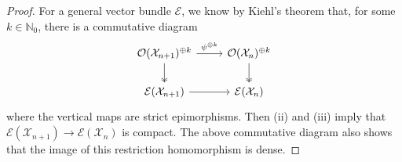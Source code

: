\documentclass[a4paper, reqno, 10pt]{amsart}
\theoremstyle{definition}
\numberwithin{equation}{section}
\newcommand{\ra}{\rightarrow}
\newcommand{\BN}{{\mathbb {N}}}
\newcommand{\CE}{{\mathcal {E}}}
\newcommand{\CO}{{\mathcal {O}}}
\newcommand{\CX}{{\mathcal {X}}}
\begin{document}
\begin{proof}
	For a general vector bundle $\CE$, we know by Kiehl's theorem \cite[9.4.3 Thm.\ 3]{BoschGuentzerRemmert84NonArchAna} that, for some $k\in \BN_0$, there is a commutative diagram
	\begin{equation*}
		\begin{tikzcd}
			\CO(\CX_{n+1})^{\oplus k} \ar[r, "\psi^{\oplus k}"]\ar[d,two heads] & \CO(\CX_{n})^{\oplus k} \ar[d, two heads] \\
			\CE(\CX_{n+1}) \ar[r] & \CE(\CX_{n})
		\end{tikzcd}
	\end{equation*}
	where the vertical maps are strict epimorphisms.
	Then  (ii) and (iii) imply that $\CE(\CX_{n+1})\ra \CE(\CX_{n})$ is compact. 
	The above commutative diagram also shows that the image of this restriction homomorphism is dense.
\end{proof}
\end{document}
